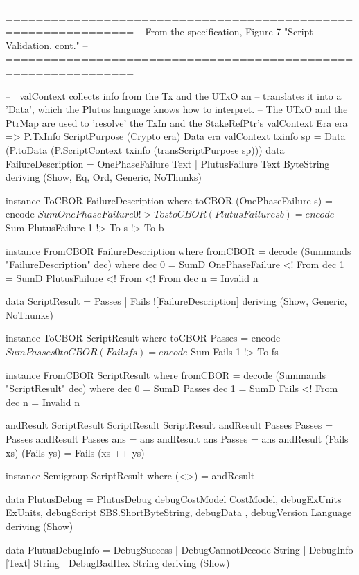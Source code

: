 -- ===============================================================
-- From the specification, Figure 7 "Script Validation, cont."
-- ===============================================================

-- | valContext collects info from the Tx and the UTxO an
--   translates it into a 'Data', which the Plutus language knows how to interpret.
--   The UTxO and the PtrMap are used to 'resolve' the TxIn and the StakeRefPtr's
valContext \in
  Era era =>
  P.TxInfo \to
  ScriptPurpose (Crypto era) \to
  Data era
valContext txinfo sp = Data (P.toData (P.ScriptContext txinfo (transScriptPurpose sp)))
\nextdef
data FailureDescription
  = OnePhaseFailure Text
  | PlutusFailure Text ByteString
  deriving (Show, Eq, Ord, Generic, NoThunks)

instance ToCBOR FailureDescription where
  toCBOR (OnePhaseFailure s) = encode $ Sum OnePhaseFailure 0 !> To s
  toCBOR (PlutusFailure s b) = encode $ Sum PlutusFailure 1 !> To s !> To b

instance FromCBOR FailureDescription where
  fromCBOR = decode (Summands "FailureDescription" dec)
    where
      dec 0 = SumD OnePhaseFailure <! From
      dec 1 = SumD PlutusFailure <! From <! From
      dec n = Invalid n

data ScriptResult = Passes | Fails ![FailureDescription]
  deriving (Show, Generic, NoThunks)

instance ToCBOR ScriptResult where
  toCBOR Passes = encode $ Sum Passes 0
  toCBOR (Fails fs) = encode $ Sum Fails 1 !> To fs

instance FromCBOR ScriptResult where
  fromCBOR = decode (Summands "ScriptResult" dec)
    where
      dec 0 = SumD Passes
      dec 1 = SumD Fails <! From
      dec n = Invalid n

andResult \in ScriptResult \to ScriptResult \to ScriptResult
andResult Passes Passes = Passes
andResult Passes ans = ans
andResult ans Passes = ans
andResult (Fails xs) (Fails ys) = Fails (xs ++ ys)

instance Semigroup ScriptResult where
  (<>) = andResult

data PlutusDebug = PlutusDebug
  { debugCostModel \in CostModel,
    debugExUnits \in ExUnits,
    debugScript \in SBS.ShortByteString,
    debugData \in [P.Data],
    debugVersion \in Language
  }
  deriving (Show)

data PlutusDebugInfo
  = DebugSuccess
  | DebugCannotDecode String
  | DebugInfo [Text] String
  | DebugBadHex String
  deriving (Show)


